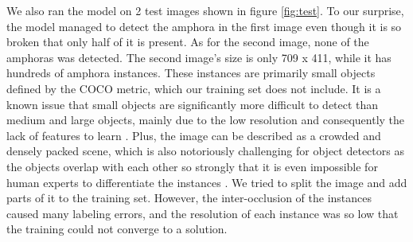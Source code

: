 \documentclass[a4paper, 11pt, oneside]{article}
\begin{document}
We also ran the model on 2 test images shown in figure \ref{fig:test}. To our surprise, the model managed to detect
the amphora in the first image even though it is so broken that only half of it is present. As for the second image,
none of the amphoras was detected. The second image's size is only 709 x 411, while it has hundreds of
amphora instances. These instances are primarily small objects defined by the COCO metric, which our training set
does not include. It is a known issue that small objects are significantly more difficult to detect than medium and
large objects, mainly due to the low resolution and consequently the lack of features to learn
\cite{kisantal2019augmentation, li2017perceptual, eggert2017closer}.
Plus, the image can be described as a crowded and densely packed scene, which is also notoriously challenging for object
detectors as the objects overlap with each other so strongly that it is even impossible for human experts to
differentiate the instances \cite{pasquet2017amphora, goldman2019precise, leibe2005pedestrian, arteta2013learning}.
We tried to split the image and add parts of it to the training set. However, the inter-occlusion of the
instances caused many labeling errors, and the resolution of each instance was so low that the training could not
converge to a solution.
\end{document}
